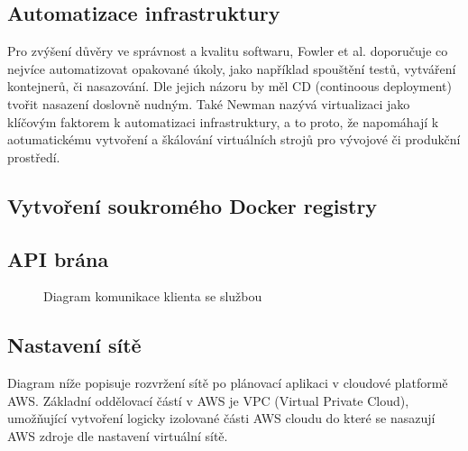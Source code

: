 \documentclass[thesis=M,czech]{FITthesis}[2019/12/23]
\theoremstyle{plain}
\theoremstyle{definition}
\begin{document}





\subsection{Automatizace infrastruktury}

Pro zvýšení důvěry ve správnost a kvalitu softwaru, Fowler et al. \cite{microservices-article} doporučuje co nejvíce automatizovat opakované úkoly, jako například spouštění testů, vytváření kontejnerů, či nasazování. Dle jejich názoru by měl CD (continoous deployment) tvořit nasazení doslovně nudným. Také Newman \cite{microservices-book} nazývá virtualizaci jako klíčovým faktorem k automatizaci infrastruktury, a to proto, že napomáhají k aotumatickému vytvoření a škálování virtuálních strojů pro vývojové či produkční prostředí.



\subsection{Vytvoření soukromého Docker registry}




\subsection{API brána}


\begin{figure}[H]\centering
	

	\caption[Diagram komunikace klienta se službou]{Diagram komunikace klienta se službou}\label{fig:float}
\end{figure}



\subsection{Nastavení sítě}

Diagram níže popisuje rozvržení sítě po plánovací aplikaci v cloudové platformě AWS. Základní oddělovací částí v AWS je VPC (Virtual Private Cloud)\cite{aws-vpc}, umožňující vytvoření logicky izolované části AWS cloudu do které se nasazují AWS zdroje dle nastavení virtuální sítě.
\end{document}
